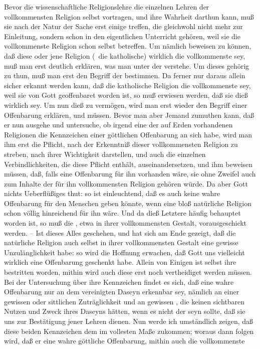\begin{aufza}
\item Bevor die wissenschaftliche Religionslehre die einzelnen Lehren der vollkommensten Religion selbst vortragen, und ihre Wahrheit darthun kann, muß sie nach der Natur der Sache erst einige  treffen, die gleichwohl nicht mehr zur Einleitung, sondern schon in den eigentlichen Unterricht gehören, weil sie die vollkommenste Religion schon selbst betreffen. Um nämlich beweisen zu können, daß diese oder jene Religion (\zB\ die katholische) wirklich die vollkommenste sey, muß man erst deutlich erklären, was man unter der  verstehe. Um dieses gehörig zu thun, muß man erst den Begriff der  bestimmen. Da ferner nur daraus allein sicher erkannt werden kann, daß die katholische Religion die vollkommenste sey, weil sie von Gott geoffenbaret worden ist, so muß erwiesen werden, daß sie dieß wirklich sey. Um nun dieß zu vermögen, wird man erst wieder den Begriff einer Offenbarung erklären, und  müssen. Bevor man aber Jemand zumuthen kann, daß er nun ausgehe und untersuche, ob irgend eine der auf Erden vorhandenen Religionen die Kennzeichen einer göttlichen Offenbarung an sich habe, wird man ihm erst die Pflicht, nach der Erkenntniß dieser vollkommensten Religion zu streben, nach ihrer Wichtigkeit darstellen, und auch die einzelnen Verbindlichkeiten, die diese Pflicht enthält, auseinandersetzen, und ihm beweisen müssen, daß, falls eine Offenbarung für ihn vorhanden wäre, sie ohne Zweifel auch zum Inhalte der für ihn vollkommensten Religion gehören würde. Da aber Gott nichts Ueberflüßiges thut: so ist einleuchtend, daß es auch keine wahre Offenbarung für den Menschen geben könnte, wenn eine bloß natürliche Religion schon völlig hinreichend für ihn wäre. Und da dieß Letztere häufig behauptet worden ist, so muß die , etwa in ihrer vollkommensten Gestalt, vorausgeschickt werden. -- Ist dieses Alles geschehen, und hat sich am Ende gezeigt, daß die natürliche Religion auch selbst in ihrer vollkommensten Gestalt eine gewisse Unzulänglichkeit habe: so wird die Hoffnung erwachen, daß Gott uns vielleicht wirklich eine Offenbarung geschenkt habe. Allein von Einigen ist selbst ihre  bestritten worden, mithin wird auch diese erst noch vertheidiget werden müssen. Bei der Untersuchung über ihre Kennzeichen findet es sich, daß eine wahre Offenbarung nur an dem vereinigten Daseyn  erkennbar sey, nämlich an einer gewissen  oder sittlichen Zuträglichkeit  und an gewissen , die keinen sichtbaren Nutzen und Zweck ihres Daseyns hätten, wenn es nicht der seyn sollte, daß sie uns zur Bestätigung jener Lehren dienen. Nun werde ich umständlich zeigen, daß diese beiden Kennzeichen dem  im vollesten Maße zukommen; woraus dann folgen wird, daß er eine wahre göttliche Offenbarung, mithin auch die vollkommenste 
\end{aufza}
